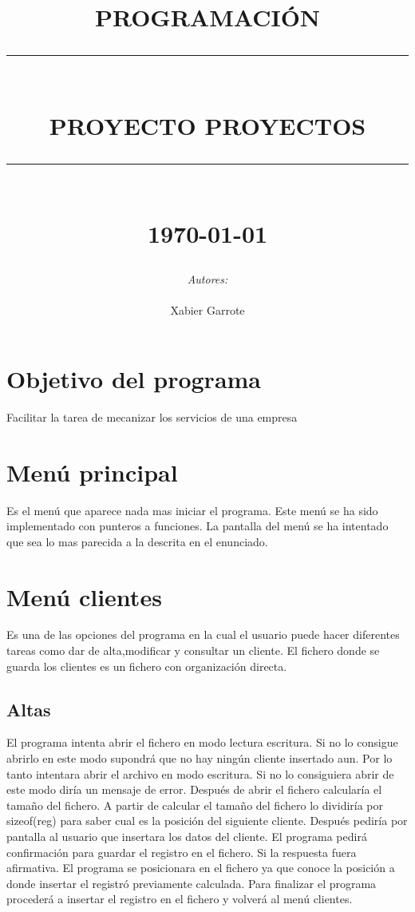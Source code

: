 \documentclass[12pt]{article}
\newcommand{\HRule}[1]{\rule{\linewidth}{#1}}
\begin{document}
\title{ \normalsize \textsc{PROGRAMACIÓN}
		\\ [2.0cm]
		\HRule{2pt} \\
		\LARGE \textbf{\uppercase{Proyecto Proyectos}}
		\HRule{2pt} \\ [0.5cm] \bigskip
		\normalsize \today \vspace*{1\baselineskip}}

\date{}

\author{
        \emph{Autores:} \\ \\
		Xabier Garrote }

\maketitle
\newpage
\tableofcontents
\newpage


\section{Objetivo del programa}
Facilitar la tarea de mecanizar los servicios de una empresa
\newpage
\section{Menú principal}
Es el menú que aparece nada mas iniciar el programa. Este menú se ha sido implementado con punteros a funciones. La pantalla del menú se ha intentado que sea lo mas parecida a la descrita en el enunciado.
\newpage
\section{Menú clientes}
Es una de las opciones del programa en la cual el usuario puede hacer diferentes tareas como dar de alta,modificar y consultar un cliente. El fichero donde se guarda los clientes es un fichero con organización directa. 
\subsection{Altas}
El programa intenta abrir el fichero en modo lectura escritura. Si no lo consigue abrirlo en este modo supondrá que no hay ningún cliente insertado aun. Por lo tanto intentara abrir el archivo en modo escritura. Si no lo consiguiera abrir de este modo diría un mensaje de error. Después de abrir el fichero calcularía el tamaño del fichero. A partir de calcular el tamaño del fichero lo dividiría por sizeof(reg) para saber cual es la posición del siguiente cliente. Después pediría por pantalla al usuario que insertara los datos del cliente. El programa pedirá confirmación para guardar el registro en el fichero. Si la respuesta fuera afirmativa. El programa se  posicionara en el fichero ya que conoce la posición a donde insertar el registró previamente calculada. Para finalizar el programa procederá a insertar el registro en el fichero y volverá al menú clientes.
\end{document}
